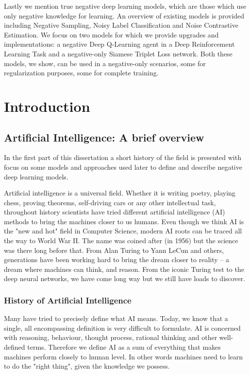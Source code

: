 \documentclass[b5paper]{book}
\begin{document}
Lastly we mention true negative deep learning models, which are those which use only negative knowledge for learning. An overview of existing models is provided including Negative Sampling, Noisy Label Classification and Noise Contrastive Estimation. We focus on two models for which we provide upgrades and implementations: a negative Deep Q-Learning agent in a Deep Reinforcement Learning Task and a negative-only Siamese Triplet Loss network. Both these models, we show, can be used in a negative-only scenarios, some for regularization purposes, some for complete training.

\tableofcontents

\mainmatter

\part{Introduction}
\chapter{Artificial Intelligence: A brief overview}

In the first part of this dissertation a short history of the field is presented with focus on some models and approaches used later to define and describe negative deep learning models. 

Artificial intelligence is a universal field. Whether it is writing poetry, playing chess, proving theorems, self-driving cars or any other intellectual task, throughout history scientists have tried different artificial intelligence (AI) methods to bring the machines closer to us humans. Even though we think AI is the "new and hot" field in Computer Science, modern AI roots can be traced all the way to World War II. The name was coined after (in 1956) but the science was there long before that. From Alan Turing to Yann LeCun and others, generations have been working hard to bring the dream closer to reality -- a dream where machines can think, and reason. From the iconic Turing test to the deep neural networks, we have come long way but we still have loads to discover.

\section{History of Artificial Intelligence}

Many have tried to precisely define what AI means. Today, we know that a single, all encompassing definition is very difficult to formulate. AI is concerned with reasoning, behaviour, thought process, rational thinking and other well-defined terms. Therefore we define AI as a sum of everything that makes machines perform closely to human level. In other words machines need to learn to do the "right thing", given the knowledge we possess.
\end{document}
